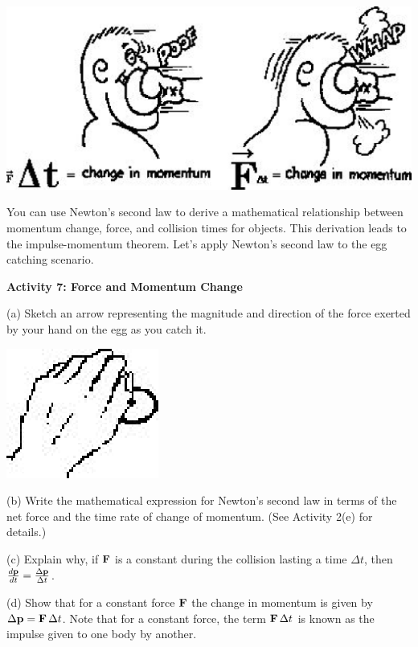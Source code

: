 \vspace{0.3cm}
{\par\centering \includegraphics{momentum_fig2.eps} \par}
\vspace{0.3cm}

You can use Newton's second law to derive a mathematical relationship between
momentum change, force, and collision times for objects. This derivation leads
to the impulse-momentum theorem. Let's apply Newton's second law to the egg
catching scenario.

\textbf{Activity 7: Force and Momentum Change }

(a) Sketch an arrow representing the magnitude and direction of the force exerted
by your hand on the egg as you catch it.

\vspace{0.3cm}
{\par\centering \includegraphics{momentum_fig3.eps} \par}
\vspace{0.3cm}

(b) Write the mathematical expression for Newton's second law in terms of the
net force and the time rate of change of momentum. (See Activity 2(e) for details.)
\vspace{10mm}

(c) Explain why, if \( {\bf F} \) is a constant during the collision
lasting a time \( \Delta  t\), then \( \frac{d{\bf p}}{dt}=\frac{\Delta 
{\bf p}}{\Delta t} \). 
\vspace{20mm}

(d) Show that for a constant force \( {\bf F} \) the change in momentum
is given by \( \Delta {\bf p}={\bf F}\,\Delta t \). Note
that for a constant force, the term \( {\bf F}\,\Delta t \) is known
as the impulse given to one body by another.

